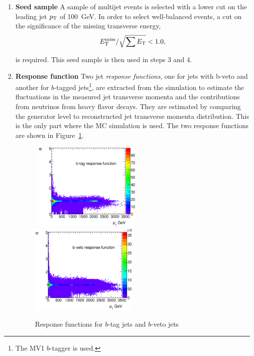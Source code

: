 \begin{enumerate}
\item{\textbf{Seed sample}} A sample of multijet events is selected with a lower cut on the leading jet $p_{\mathrm{T}}$ of 100~GeV.
In order to select well-balanced events, a cut on the significance of the missing transverse energy,
\begin{equation}
E_{\mathrm{T}}^{\mathrm{miss}} / \sqrt{\sum{\ensuremath{E_{\mathrm{T}}}}} < 1.0,
\label{eq:JetSmearingMetSignificance}
\end{equation}

\noindent is required.
This seed sample is then used in steps 3 and 4.

\item{\textbf{Response function}}  Two jet \emph{response functions}, one for jets with b-veto and another for $b$-tagged jets\footnote{The MV1 $b$-tagger is used.}, are extracted from the simulation to estimate the fluctuations in the measured jet transverse momenta and the contributions from neutrinos from heavy flavor decays.
They are estimated by comparing the generator level to reconstructed jet transverse momenta distribution.
This is the only part where the MC simulation is used.
The two response functions are shown in Figure~\ref{fig:JetSmearingResponseFunctions}.

\begin{figure}[!ht]
  \begin{center}
    \mbox{
      \includegraphics[width=0.495\textwidth]{Appendix_JetSmearingMethod/Figures/jetsmearing25_R_btag.eps}
      \includegraphics[width=0.495\textwidth]{Appendix_JetSmearingMethod/Figures/jetsmearing25_R_bveto.eps}
    }
  \end{center}
  \caption{Response functions for $b$-tag jets and $b$-veto jets}
  \label{fig:JetSmearingResponseFunctions}
\end{figure}


\end{enumerate}
